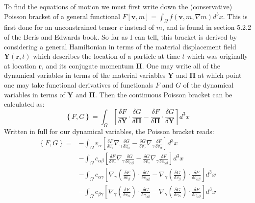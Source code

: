 \documentclass[reqno]{article}
\begin{document}
  To find the equations of motion we must first write down the (conservative)
  Poisson bracket of a general functional $F[\mathbf{v}, m] = \int_\Omega
  f(\mathbf{v}, m, \nabla m) d^3 x$.
  This is first done for an unconstrained tensor $c$ instead of $m$, and is
  found in section 5.2.2 of the Beris and Edwards book.
  So far as I can tell, this bracket is derived by considering a general
  Hamiltonian in terms of the material displacement field
  $\mathbf{Y}(\mathbf{r}, t)$ which describes the location of a particle at
  time $t$ which was originally at location $\mathbf{r}$, and its conjugate
  momentum $\boldsymbol{\Pi}$.
  One may write all of the dynamical variables in terms of the material
  variables $\mathbf{Y}$ and $\boldsymbol{\Pi}$ at which point one may take
  functional derivatives of functionals $F$ and $G$ of the dynamical variables
  in terms of $\mathbf{Y}$ and $\boldsymbol{\Pi}$.
  Then the continuous Poisson bracket can be calculated as:
  \begin{equation}
    \left\{ F, G \right\}
    =
    \int_\Omega \left[
      \frac{\delta F}{\delta \mathbf{Y}} \cdot \frac{\delta G}{\delta \boldsymbol{\Pi}}
      -
      \frac{\delta F}{\delta \boldsymbol{\Pi}} \cdot \frac{\delta G}{\delta \mathbf{Y}}
    \right] d^3 x
  \end{equation}
  Written in full for our dynamical variables, the Poisson bracket reads:
  \begin{equation}
    \begin{split}
    \left\{ F, G \right\}
    =
      &- \int_\Omega v_\alpha
      \left[ \frac{\delta F}{\delta v_\gamma} \nabla_\gamma \frac{\delta G}{\delta v_\alpha}
        - \frac{\delta G}{\delta v_\gamma} \nabla_\gamma \frac{\delta F}{\delta v_\alpha}
      \right] d^3x \\
      &- \int_\Omega c_{\alpha \beta} \left[
        \frac{\delta F}{\delta v_\gamma} \nabla_\gamma \frac{\delta G}{\delta c_{\alpha \beta}}
        - \frac{\delta G}{\delta v_\gamma} \nabla_\gamma \frac{\delta F}{\delta c_{\alpha \beta}}
      \right] d^3 x\\
      &- \int_\Omega c_{\alpha \gamma} \left[
        \nabla_\gamma \left(\frac{\delta F}{\delta v_\beta}\right) \cdot \frac{\delta G}{\delta c_{\alpha \beta}}
        - \nabla_\gamma \left(\frac{\delta G}{\delta v_\beta}\right) \cdot \frac{\delta F}{\delta c_{\alpha \beta}}
      \right] d^3 x\\
      &- \int_\Omega c_{\beta \gamma} \left[
        \nabla_\gamma \left(\frac{\delta F}{\delta v_\alpha}\right) \cdot \frac{\delta G}{\delta c_{\alpha \beta}}
        - \nabla_\gamma \left(\frac{\delta G}{\delta v_\alpha}\right) \cdot \frac{\delta F}{\delta c_{\alpha \beta}}
      \right] d^3 x
    \end{split}
  \end{equation}
\end{document}
